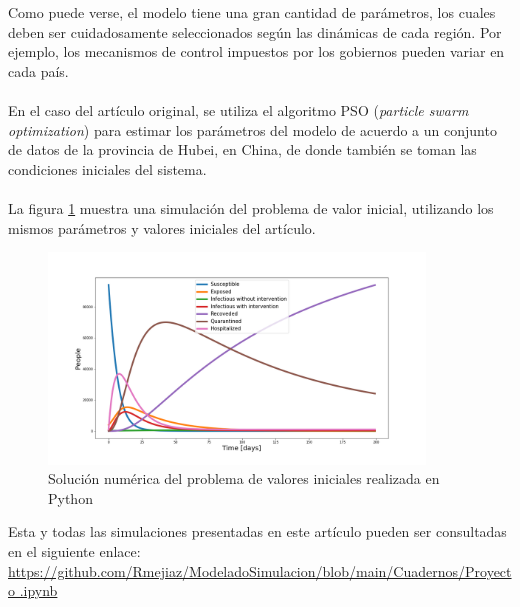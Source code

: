 \documentclass[conference]{IEEEtran}
\begin{document}
Como puede verse, el modelo tiene una gran cantidad de parámetros, los cuales deben
ser cuidadosamente seleccionados según las dinámicas de cada región. Por ejemplo, los 
mecanismos de control impuestos por los gobiernos pueden variar en cada país.
\\\\
En el caso del artículo original, se utiliza el algoritmo PSO (\textit{particle swarm optimization})
para estimar los parámetros del modelo de acuerdo a un conjunto de datos de la provincia
de Hubei, en China, de donde también se toman las condiciones iniciales del sistema.
\\\\
La figura \ref{pvi_1} muestra una simulación del problema de valor inicial, utilizando
los mismos parámetros y valores iniciales del artículo.

\begin{figure}[h]
    \centering
    \includegraphics[width=10cm]{../Figures/ivp_1.png}
    \caption{Solución numérica del problema de valores iniciales realizada en Python}
    \label{pvi_1}
\end{figure}

Esta y todas las simulaciones presentadas en este artículo pueden ser consultadas en 
el siguiente enlace: \href{https://github.com/Rmejiaz/ModeladoSimulacion/blob/main/Cuadernos/Proyecto.ipynb}{https://github.com/Rmejiaz/ModeladoSimulacion/blob/main/Cuadernos/Proyecto
.ipynb}
\end{document}

